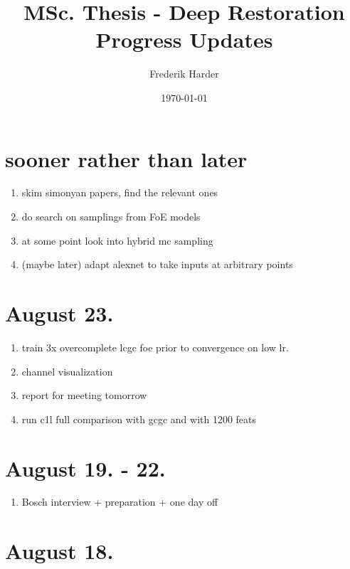 \documentclass{article}
\title{MSc. Thesis - Deep Restoration\\Progress Updates}
\date{\today}
\author{Frederik Harder}
\begin{document}
\maketitle

\section*{sooner rather than later}

\begin{enumerate}
	\item skim simonyan papers, find the relevant ones
	\item do search on samplings from FoE models
	\item at some point look into hybrid mc sampling
	\item (maybe later) adapt alexnet to take inputs at arbitrary points
\end{enumerate}

\section{August 23.}

\begin{enumerate}
	\item train 3x overcomplete lcgc foe prior to convergence on low lr.
	\item channel visualization
	\item report for meeting tomorrow
	\item run c1l full comparison with gcgc and with 1200 feats
\end{enumerate}

\section{August 19. - 22.}

\begin{enumerate}
	\item Bosch interview + preparation + one day off
\end{enumerate}


\section{August 18.}
\end{document}
